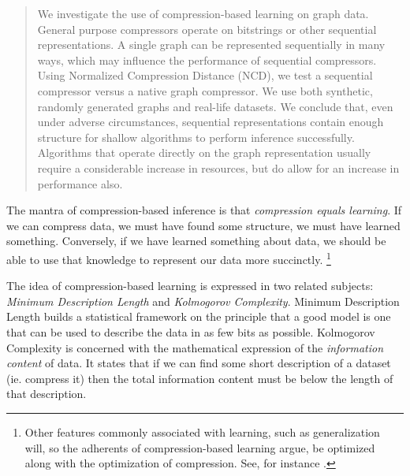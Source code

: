 \documentclass{article}
\begin{document}

\begin{abstract}
We investigate the use of compression-based learning on graph data. General purpose compressors operate on bitstrings or other sequential representations. A single graph can be represented sequentially in many ways, which may influence the performance of sequential compressors. Using Normalized Compression Distance (NCD), we test a sequential compressor versus a native graph compressor. We use both synthetic, randomly generated graphs and real-life datasets. We conclude that, even under adverse circumstances, sequential representations contain enough structure for shallow algorithms to perform inference successfully. Algorithms that operate directly on the graph representation usually require a considerable increase in resources, but do allow for an increase in performance also.
\end{abstract}

The mantra of compression-based inference is that \emph{compression equals learning}. If we can compress data, we must have found some structure, we must have learned something. Conversely, if we have learned something about data, we should be able to use that knowledge to represent our data more succinctly. \footnote{Other features commonly associated with learning, such as generalization will, so the adherents of compression-based learning argue, be optimized along with the optimization of compression. See, for instance .}

The idea of compression-based learning is expressed in two related subjects: \emph{Minimum Description Length} and \emph{Kolmogorov Complexity}. Minimum Description Length \cite{grunwald2007minimum} builds a statistical framework on the principle that a good model is one that can be used to describe the data in as few bits as possible. Kolmogorov Complexity \cite{li1997introduction} is concerned with the mathematical expression of the \emph{information content} of  data. It states that if we can find some short description of a dataset (ie. compress it) then the total information content must be below the length of that description.
\end{document}
